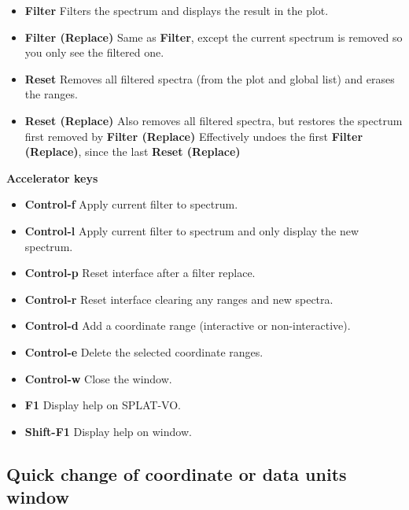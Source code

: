 \documentclass[twoside,11pt]{article}
\renewcommand{\_}{\texttt{\symbol{95}}}
\newcommand{\SPLAT}{\textsf{SPLAT-VO}}
\newcommand{\labelitem}[1]{\textbf{#1}}
\newcommand{\subheading}[1]{\textbf{\large{#1}}}
\begin{document}
\begin{itemize}

\item \labelitem{Filter} Filters the spectrum and displays the result in the
plot.

\item \labelitem{Filter (Replace)} Same as \labelitem{Filter}, except the
current spectrum is removed so you only see the filtered one.

\item \labelitem{Reset} Removes all filtered spectra (from the plot and global
list) and erases the ranges.

\item \labelitem{Reset (Replace)} Also removes all filtered spectra, but
restores the spectrum first removed by \labelitem{Filter (Replace)}
Effectively undoes the first \labelitem{Filter (Replace)}, since the last
\labelitem{Reset (Replace)}

\end{itemize}

\subheading{Accelerator keys}

\begin{itemize}
\item \labelitem{Control-f} Apply current filter to spectrum.
\item \labelitem{Control-l} Apply current filter to spectrum and only display the new spectrum.
\item \labelitem{Control-p} Reset interface after a filter replace.
\item \labelitem{Control-r} Reset interface clearing any ranges and new spectra.

\item \labelitem{Control-d} Add a coordinate range (interactive or non-interactive).
\item \labelitem{Control-e} Delete the selected coordinate ranges.

\item \labelitem{Control-w} Close the window.
\item \labelitem{F1} Display help on \SPLAT.
\item \labelitem{Shift-F1} Display help on window.
\end{itemize}


\newpage
\subsection{Quick change of coordinate or data units window}
\end{document}
